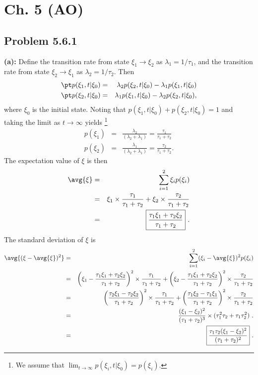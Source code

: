 \section{Ch. 5 (AO)}
\subsection{Problem 5.6.1}

\textbf{(a):} Define the transition rate from state $\xi_1 \rightarrow \xi_2$ as $\lambda_1=1/\tau_1$, and the transition rate from state $\xi_2 \rightarrow \xi_1$ as $\lambda_2=1/\tau_2$. Then
\begin{eqnarray}
\pt p(\xi_1, t|\xi_0) &=& \lambda_2 p(\xi_2, t|\xi_0) - \lambda_1 p(\xi_1, t|\xi_0) \nonumber \\
\pt p(\xi_2, t|\xi_0) &=& \lambda_1 p(\xi_1, t|\xi_0) - \lambda_2 p(\xi_2, t|\xi_0), \nonumber
\end{eqnarray}
where $\xi_0$ is the initial state. Noting that $p(\xi_1, t| \xi_0) + p(\xi_2, t| \xi_0) = 1$ and taking the limit as $t\rightarrow \infty$ yields \footnote{We assume that $\lim_{t\rightarrow \infty} p(\xi_i, t|\xi_0) = p(\xi_i)$.}
\begin{eqnarray}
p(\xi_1) &=& \frac{\lambda_2}{(\lambda_2 + \lambda_1)} = \frac{\tau_1}{\tau_1 + \tau_2} \nonumber \\
p(\xi_2) &=& \frac{\lambda_1}{(\lambda_2 + \lambda_1)} = \frac{\tau_2}{\tau_1 + \tau_2}. \nonumber
\end{eqnarray}
The expectation value of $\xi$ is then
\begin{eqnarray}
\avg{\xi} &=& \sum_{i=1}^{2} \xi_i p(\xi_i) \nonumber \\
&=& \xi_1 \times \frac{\tau_1}{\tau_1 + \tau_2} + \xi_2 \times \frac{\tau_2}{\tau_1 + \tau_2} \nonumber \\
&=& \boxed{\frac{\tau_1 \xi_1 + \tau_2 \xi_2}{\tau_1 + \tau_2}}~. \nonumber
\end{eqnarray}
The standard deviation of $\xi$ is
\begin{eqnarray}
\avg{(\xi-\avg{\xi})^2} &=& \sum_{i=1}^{2} (\xi_i - \avg{\xi})^2 p(\xi_i) \nonumber \\ 
&=& \bigg(\xi_1 - \frac{\tau_1 \xi_1 + \tau_2 \xi_2}{\tau_1 + \tau_2}\bigg)^2 \times \frac{\tau_1}{\tau_1 + \tau_2} + \bigg(\xi_2 - \frac{\tau_1 \xi_1 + \tau_2 \xi_2}{\tau_1 + \tau_2}\bigg)^2 \times \frac{\tau_2}{\tau_1 + \tau_2} \nonumber \\
&=& \bigg(\frac{\tau_2 \xi_1 - \tau_2 \xi_2}{\tau_1 + \tau_2}\bigg)^2 \times \frac{\tau_1}{\tau_1 + \tau_2} + \bigg(\frac{\tau_1 \xi_2 - \tau_1 \xi_1}{\tau_1 + \tau_2}\bigg)^2 \times \frac{\tau_2}{\tau_1 + \tau_2} \nonumber \\
&=& \frac{(\xi_1-\xi_2)^2}{(\tau_1 + \tau_2)^3} \times ( \tau_1^2 \tau_2 + \tau_1 \tau_2^2)~. \nonumber \\
&=& \boxed{\frac{\tau_1 \tau_2 (\xi_1-\xi_2)^2}{(\tau_1 + \tau_2)^2}} ~. \nonumber \\
\end{eqnarray}

